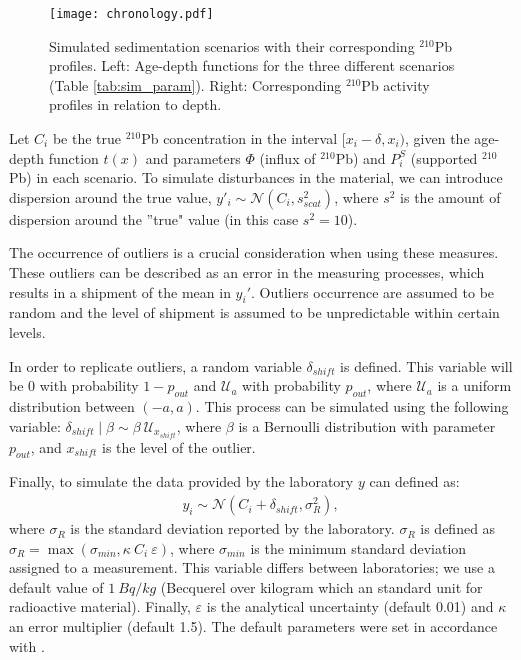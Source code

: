 \documentclass [10pt] {article}
\begin{document}
\begin{figure}[!h]
 \centering
  \texttt{[image: chronology.pdf]}
	\caption{Simulated sedimentation scenarios with their corresponding $^{210}$Pb profiles. Left: Age-depth functions for the three different scenarios (Table \ref{tab:sim_param}). Right: Corresponding $^{210}$Pb activity profiles in relation to depth.}
  \label{fig:true_210}
\end{figure}

	Let $C_{i}$ be the true $^{210}$Pb concentration in the interval $[ x_i-\delta, x_i)$, given the age-depth function $t(x)$ and parameters $\Phi$ (influx of $^{210}$Pb) and $P_i^S$ (supported $^{210}$Pb) in each scenario. 
To simulate disturbances in the material, we can introduce dispersion around the true value, $y'_i \sim \mathcal{N}\left(C_i,s^2_{scat} \right)$, where $s^2$ is the amount of dispersion around the ''true" value (in this case $s^2=10$). 

The occurrence of outliers is a crucial consideration when using these measures.
These outliers can be described as an error in the measuring processes, which results in a shipment of the mean in $y_i'$.
Outliers occurrence are assumed to be random and the level of shipment is assumed to be unpredictable within certain levels.

In order to replicate outliers, a random variable $\delta_{shift}$ is defined.
This variable will be $0$ with probability $1-p_{out}$ and $\mathcal{U}_a$ with probability $p_{out}$, where $\mathcal{U}_a$ is a uniform distribution between $(-a,a)$.
This process can be simulated using the following variable: $\delta_{shift}\mid\beta \sim \beta\ \mathcal{U}_{x_{shift}}$, where $\beta$ is a Bernoulli distribution with parameter $p_{out}$, and $x_{shift}$ is the level of the outlier. 

Finally, to simulate the data provided by the laboratory $y$ can defined as:   
\begin{align}
	y_i\sim\mathcal{N}\left(C_{i} + \delta_{shift}, \sigma^2_{R} \right), 
\end{align}
where $\sigma_R$ is the standard deviation reported by the laboratory. 
$\sigma_R$ is defined as $\sigma_R= \max \left(\sigma_{min}, \kappa~C_i ~\varepsilon \right)$, where $\sigma_{min}$ is the minimum standard deviation assigned to a measurement. This variable differs between laboratories; we use a default value of $1~ Bq/kg$ (Becquerel over kilogram which an standard unit for radioactive material). 
Finally, $\varepsilon$ is the analytical uncertainty (default 0.01) and $\kappa$ an error multiplier (default 1.5).
The default parameters were set in accordance with \citet{Blaauw2018}.
\end{document}
